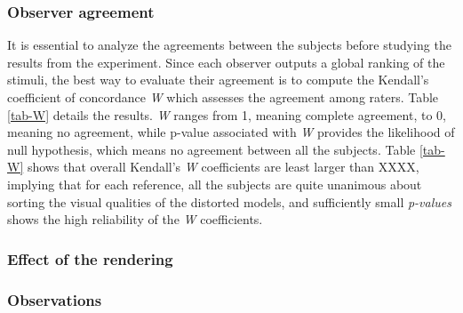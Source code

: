 \subsubsection{Observer agreement}
It is essential to analyze the agreements between the subjects before studying the results from the experiment. Since each observer outputs a global ranking of the stimuli, the best way to evaluate their agreement is to compute the Kendall's coefficient of concordance \textit{W} \cite{Kendall_1940} which assesses the agreement among raters. Table \ref{tab-W} details the results. \textit{W} ranges from 1, meaning complete agreement, to 0, meaning no agreement, while p-value associated with \textit{W} provides the likelihood of null hypothesis, which means no agreement between all the subjects. Table \ref{tab-W} shows that overall Kendall’s \textit{W} coefficients are least larger than XXXX, implying that for each reference, all the subjects are quite unanimous about sorting the visual qualities of the distorted models, and sufficiently small \textit{p-values} shows the high reliability of the \textit{W} coefficients.\\
\begin{table}[htb]
		
   \label{tab-W}
\end{table}


\subsubsection{Effect of the rendering}


\subsubsection{Observations}